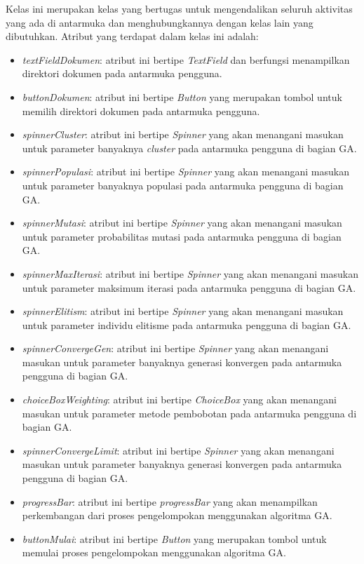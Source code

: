 Kelas ini merupakan kelas yang bertugas untuk mengendalikan seluruh aktivitas yang ada di antarmuka dan menghubungkannya dengan kelas lain yang dibutuhkan. Atribut yang terdapat dalam kelas ini adalah:

\begin{itemize}
	\item \textit{textFieldDokumen}: atribut ini bertipe \textit{TextField} dan berfungsi menampilkan direktori dokumen pada antarmuka pengguna.
	\item \textit{buttonDokumen}: atribut ini bertipe \textit{Button} yang merupakan tombol untuk memilih direktori dokumen pada antarmuka pengguna.
	\item \textit{spinnerCluster}: atribut ini bertipe \textit{Spinner} yang akan menangani masukan untuk parameter banyaknya \textit{cluster} pada antarmuka pengguna di bagian GA.
	\item \textit{spinnerPopulasi}: atribut ini bertipe \textit{Spinner} yang akan menangani masukan untuk parameter banyaknya populasi pada antarmuka pengguna di bagian GA.
	\item \textit{spinnerMutasi}: atribut ini bertipe \textit{Spinner} yang akan menangani masukan untuk parameter probabilitas mutasi pada antarmuka pengguna di bagian GA.
	\item \textit{spinnerMaxIterasi}: atribut ini bertipe \textit{Spinner} yang akan menangani masukan untuk parameter maksimum iterasi pada antarmuka pengguna di bagian GA.
	\item \textit{spinnerElitism}: atribut ini bertipe \textit{Spinner} yang akan menangani masukan untuk parameter individu elitisme pada antarmuka pengguna di bagian GA.
	\item \textit{spinnerConvergeGen}: atribut ini bertipe \textit{Spinner} yang akan menangani masukan untuk parameter banyaknya generasi konvergen pada antarmuka pengguna di bagian GA.
	\item \textit{choiceBoxWeighting}: atribut ini bertipe \textit{ChoiceBox} yang akan menangani masukan untuk parameter metode pembobotan pada antarmuka pengguna di bagian GA.
	\item \textit{spinnerConvergeLimit}: atribut ini bertipe \textit{Spinner} yang akan menangani masukan untuk parameter banyaknya generasi konvergen pada antarmuka pengguna di bagian GA.
	\item \textit{progressBar}: atribut ini bertipe \textit{progressBar} yang akan menampilkan perkembangan dari proses pengelompokan menggunakan algoritma GA.
	\item \textit{buttonMulai}: atribut ini bertipe \textit{Button} yang merupakan tombol untuk memulai proses pengelompokan menggunakan algoritma GA.

\end{itemize}
